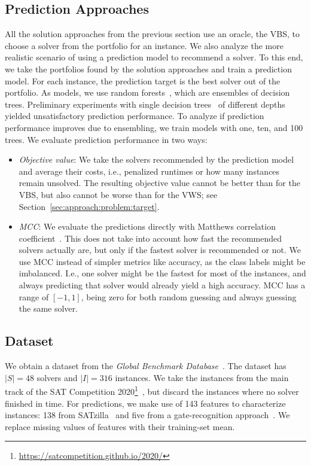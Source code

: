 \documentclass[conference]{IEEEtran}
\begin{document}
\subsection{Prediction Approaches}

All the solution approaches from the previous section use an oracle, the VBS, to choose a solver from the portfolio for an instance.
We also analyze the more realistic scenario of using a prediction model to recommend a solver.
To this end, we take the portfolios found by the solution approaches and train a prediction model.
For each instance, the prediction target is the best solver out of the portfolio.
As models, we use random forests~\cite{breiman2001random}, which are ensembles of decision trees.
Preliminary experiments with single decision trees~\cite{breiman1984classification} of different depths yielded unsatisfactory prediction performance.
To analyze if prediction performance improves due to ensembling, we train models with one, ten, and 100 trees.
We evaluate prediction performance in two ways:

\begin{itemize}
	\item \emph{Objective value}:
	We take the solvers recommended by the prediction model and average their costs, i.e., penalized runtimes or how many instances remain unsolved.
	The resulting objective value cannot be better than for the VBS, but also cannot be worse than for the VWS; see Section~\ref{sec:approach:problem:target}.
	\item \emph{MCC}:
	We evaluate the predictions directly with Matthews correlation coefficient~\cite{matthews1975comparison, gorodkin2004comparing}.
	This does not take into account how fast the recommended solvers actually are, but only if the fastest solver is recommended or not.
	We use MCC instead of simpler metrics like accuracy, as the class labels might be imbalanced.
	I.e., one solver might be the fastest for most of the instances, and always predicting that solver would already yield a high accuracy.
	MCC has a range of $[-1,1]$, being zero for both random guessing and always guessing the same solver.
\end{itemize}

\subsection{Dataset}

We obtain a dataset from the \emph{Global Benchmark Database}~\cite{iser2020collaborative}.
The dataset has $|S| = 48$ solvers and $|I| = 316$ instances.
We take the instances from the main track of the SAT Competition 2020\footnote{\url{https://satcompetition.github.io/2020/}}~\cite{balyo2020proceedings}, but discard the instances where no solver finished in time.
For predictions, we make use of 143 features to characterize instances:
138 from SATzilla~\cite{xu2008satzilla, xu2012satzilla2012} and five from a gate-recognition approach~\cite{iser2020recognition}.
We replace missing values of features with their training-set mean.
\end{document}
